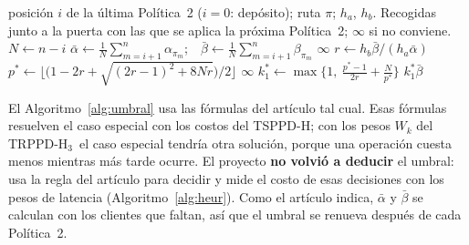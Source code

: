 \documentclass{article}
\newcommand{\TSPPDH}{TSPPD-H}
\newcommand{\TRPPDH}{TRPPD-H$_3$}
\begin{document}
\begin{algorithm}[H]
\caption{$\textsc{Umbral}(i, \pi)$ \quad (Sección~2.2, umbral~2)}
\label{alg:umbral}
\begin{algorithmic}[1]
\Require posición $i$ de la última Política~2 ($i = 0$: depósito); ruta $\pi$; $h_a$, $h_b$.
\Ensure Recogidas junto a la puerta con las que se aplica la próxima Política~2; $\infty$ si no conviene.
\State $N \gets n - i$ 
\State $\bar\alpha \gets \frac{1}{N} \sum_{m=i+1}^{n} \alpha_{\pi_m}$;\ \ $\bar\beta \gets \frac{1}{N} \sum_{m=i+1}^{n} \beta_{\pi_m}$ 
    \State \Return $\infty$
\EndIf
\State $r \gets h_b \bar\beta / (h_a \bar\alpha)$
\State $p^* \gets \big\lfloor \big(1 - 2r + \sqrt{(2r-1)^2 + 8Nr}\big) / 2 \big\rfloor$ 
    \State \Return $\infty$ 
\EndIf
\State $k_1^* \gets \max\big\{1,\ \frac{p^* - 1}{2r} + \frac{N}{p^*}\big\}$ 
\State \Return $k_1^* \bar\beta$
\end{algorithmic}
\end{algorithm}

\noindent El Algoritmo~\ref{alg:umbral} usa las fórmulas del artículo tal cual. Esas fórmulas resuelven el caso especial con los costos del \TSPPDH; con los pesos $W_k$ del \TRPPDH\ el caso especial tendría otra solución, porque una operación cuesta menos mientras más tarde ocurre. El proyecto \textbf{no volvió a deducir} el umbral: usa la regla del artículo para decidir y mide el costo de esas decisiones con los pesos de latencia (Algoritmo~\ref{alg:heur}). Como el artículo indica, $\bar\alpha$ y $\bar\beta$ se calculan con los clientes que faltan, así que el umbral se renueva después de cada Política~2.
\end{document}

